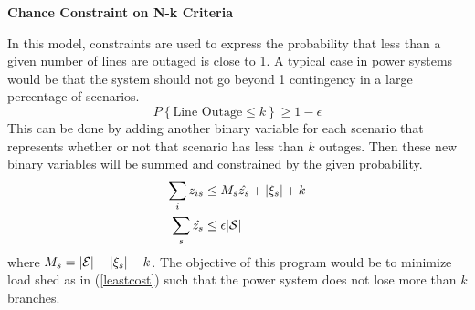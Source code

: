 \textbf{Chance Constraint on N-k Criteria}

In this model, constraints are used to express the probability that less than a given number of lines are outaged is close to 1.  A typical case in power systems would be that the system should not go beyond 1 contingency in a large percentage of scenarios.
\begin{equation}
P\left\{\text{Line Outage} \le k \right\} \ge 1 - \epsilon
\end{equation}
This can be done by adding another binary variable for each scenario that represents whether or not that scenario has less than $k$ outages.  Then these new binary variables will be summed and constrained by the given probability.
\begin{subequations}
\begin{align}
\sum_i z_{is} &\le	M_s \hat{z_s} + | \xi_s | + k \\
\sum_s \hat{z_s} &\le \epsilon | \mathcal{S} |
\end{align}
\end{subequations}
where $M_s = | \mathcal{E} | - | \xi_s | - k$.  The objective of this program would be to minimize load shed as in (\ref{leastcost}) such that the power system does not lose more than $k$ branches.
